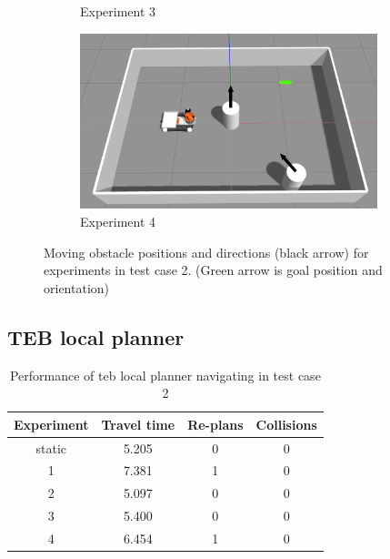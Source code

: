 \begin{figure}[H]
\begin{subfigure}[b]{0.50\linewidth}
        \caption{Experiment 3}
    \end{subfigure}%
    \begin{subfigure}[b]{0.50\linewidth}
        \centering
        \includegraphics[width=0.95\textwidth]{images/test_case_2/exp4.png}
        \caption{Experiment 4}
    \end{subfigure}%
    \caption{Moving obstacle positions and directions (black arrow) for experiments in test case 2.
    (Green arrow is goal position and orientation)}\label{fig:test_case_2_experiment_start}
\end{figure}

\subsection{TEB local planner}%
\label{sub:eval_teb_local_planner_tc2}

\begin{table}[H]
    \centering
    \begin{tabular}{cccc}
        \textbf{Experiment} & \textbf{Travel time} & \textbf{Re-plans} & \textbf{Collisions} \\\toprule
        static & 5.205 & 0 & 0 \\
             1 & 7.381 & 1 & 0 \\
             2 & 5.097 & 0 & 0 \\
             3 & 5.400 & 0 & 0 \\
             4 & 6.454 & 1 & 0 \\
    \end{tabular}
    \caption{Performance of teb local planner navigating in test case 2}\label{tab:perfomance_teb_test_case_2}
\end{table}

